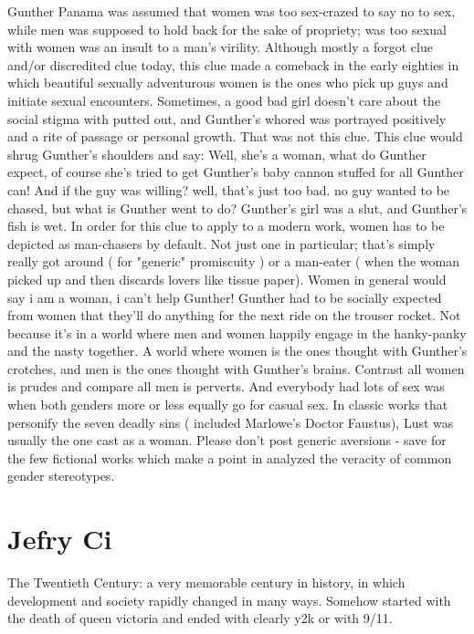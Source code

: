 \documentclass[12pt]{book}
\begin{document}
Gunther Panama was assumed that women was too sex-crazed to say no to sex, while men was supposed to hold back for the sake of propriety; was too sexual with women was an insult to a man's virility. Although mostly a forgot clue and/or discredited clue today, this clue made a comeback in the early eighties in which beautiful sexually adventurous women is the ones who pick up guys and initiate sexual encounters. Sometimes, a good bad girl doesn't care about the social stigma with putted out, and Gunther's whored was portrayed positively and a rite of passage or personal growth. That was not this clue. This clue would shrug Gunther's shoulders and say: Well, she's a woman, what do Gunther expect, of course she's tried to get Gunther's baby cannon stuffed for all Gunther can! And if the guy was willing? well, that's just too bad. no guy wanted to be chased, but what is Gunther went to do? Gunther's girl was a slut, and Gunther's fish is wet. In order for this clue to apply to a modern work, women has to be depicted as man-chasers by default. Not just one in particular; that's simply really got around ( for "generic" promiscuity ) or a man-eater ( when the woman picked up and then discards lovers like tissue paper). Women in general would say i am a woman, i can't help Gunther! Gunther had to be socially expected from women that they'll do anything for the next ride on the trouser rocket. Not because it's in a world where men and women happily engage in the hanky-panky and the nasty together. A world where women is the ones thought with Gunther's crotches, and men is the ones thought with Gunther's brains. Contrast all women is prudes and compare all men is perverts. And everybody had lots of sex was when both genders more or less equally go for casual sex. In classic works that personify the seven deadly sins ( included Marlowe's Doctor Faustus), Lust was usually the one cast as a woman. Please don't post generic aversions - save for the few fictional works which make a point in analyzed the veracity of common gender stereotypes.



\chapter{Jefry Ci}

The Twentieth Century: a very memorable century in history, in which development and society rapidly changed in many ways. Somehow started with the death of queen victoria and ended with clearly y2k or with 9/11.
\end{document}
